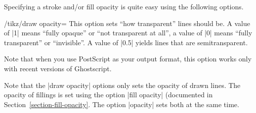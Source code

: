 Specifying a stroke and/or fill opacity is quite easy using the following
options.

\begin{key}{/tikz/draw opacity=}
    This option sets ``how transparent'' lines should be. A value of |1| means
    ``fully opaque'' or ``not transparent at all'', a value of |0| means
    ``fully transparent'' or ``invisible''. A value of |0.5| yields lines that
    are semitransparent.

    Note that when you use PostScript as your output format, this option works
    only with recent versions of Ghostscript.
\begin{codeexample}[]
\end{codeexample}
\end{key}

Note that the |draw opacity| options only sets the opacity of drawn lines. The
opacity of fillings is set using the option |fill opacity| (documented in
Section~\ref{section-fill-opacity}. The option |opacity| sets both at the same
time.

